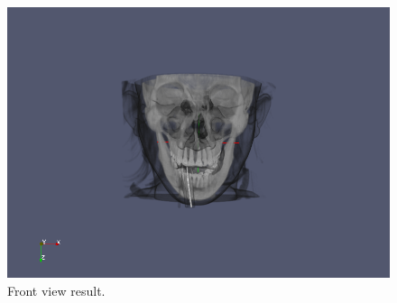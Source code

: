 \documentclass[a4paper]{article}
\begin{document}
\begin{figure}[H]
    \includegraphics[width=1\linewidth]{lab5/head-front-screenshot.png}
    \caption{Front view result.}
    \label{fig:headfront}
\end{figure}
\end{document}
